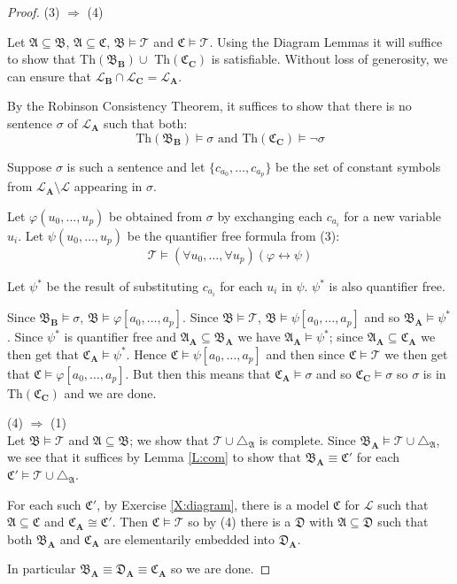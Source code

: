 \documentclass[titlepage, oneside]{amsbook}
\theoremstyle{plain}
\theoremstyle{definition}
\theoremstyle{remark}
\newcommand{\Th}{\ensuremath{\mbox{Th}}}
\newcommand{\tria}[1]{\ensuremath{\triangle_{\mathfrak{#1}}}}
\newcommand{\theory}{\ensuremath{\mathcal{T}}}
\newcommand{\lan}{\ensuremath{\mathcal{L}}}
\newcommand{\seq}{\ensuremath{\subseteq}}
\newcommand{\ma}{\ensuremath{\mathfrak{A}}}
\newcommand{\mb}{\ensuremath{\mathfrak{B}}}
\newcommand{\mc}{\ensuremath{\mathfrak{C}}}
\newcommand{\md}{\ensuremath{\mathfrak{D}}}
\newcommand{\ba}{\ensuremath{\mathbf{A}}}
\newcommand{\bb}{\ensuremath{\mathbf{B}}}
\newcommand{\bc}{\ensuremath{\mathbf{C}}}
\newcommand{\anot}[2][0]{\ensuremath{ a_{#1} , \dots , a_{#2}}}
\begin{document}
\begin{proof}
(3) $\Rightarrow$ (4)


Let $\mathfrak{A} \subseteq \mathfrak B$, $\mathfrak A \subseteq
\mathfrak C$, $\mathfrak B \models \mathcal T $ and $ \mathfrak C
\models \mathcal T$. Using the Diagram Lemmas it will suffice  
to show that Th$(\mathfrak{B}_{\bb}) \cup
$ Th$(\mathfrak{C}_{\bc} )$ is satisfiable. Without loss of generosity,
we can ensure that $\lan_\bb \cap \lan_\bc = \lan_\ba$.


By the Robinson Consistency Theorem, it suffices to show that there is
no sentence $\sigma$ of $\mathcal{L}_{\ba}$  such that both: \[
\mbox{Th}(\mathfrak{B}_{\bb} ) \models
\sigma \mbox{ and } \mbox{Th} (\mathfrak{C}_{\bc}) \models \neg \sigma
\]


Suppose $\sigma$ is such a sentence and let $\{ c_{a_0}  , \dots , c_{a_p} \}$ be the set of constant symbols
from $\mathcal{L}_\ba \setminus \mathcal L$ appearing in $\sigma$.

Let $\varphi  (u_0, \dots , u_p )$ be obtained from $\sigma$ by  
exchanging each 
$c_{a_i}$ for a new variable $u_i$.    Let $\psi (u_0, \dots, u_p)$ be
the quantifier free formula from (3): \[ \mathcal T \models (\forall
u_0,\dots ,\forall u_p) ( \varphi \leftrightarrow \psi ) \]

Let $\psi^{\ast}$ be the result of substituting $c_{a_i}$ for each
$u_i$ in $\psi$.  $\psi^{\ast}$ is also quantifier free.

Since $\mb_\bb \models \sigma$, $\mb \models \varphi [ \anot p ]$.
Since
$\mb \models \theory$, $\mb \models \psi [ \anot p ]$ and so
$\mb_\ba \models \psi^{\ast}$.  Since $\psi^{\ast}$ is quantifier
free and $\ma_\ba \seq \mb_\ba$ we have $\ma_\ba \models
\psi^{\ast}$; since $\ma_\ba \seq \mc_\ba $ we then get that
$\mc_\ba \models \psi^{\ast}$.  Hence $\mc \models \psi [ \anot p
] $ and then since $\mc \models \theory$ we then get that $\mc \models
\varphi [ \anot p ]$.  But then this means that $\mc_\ba \models
\sigma$
and so $\mc_\bc \models \sigma$ so $\sigma$ is in $\Th ( \mc_\bc )$ and
we are done.

(4) $\Rightarrow$ (1) \\
Let $\mb \models \theory$ and $\ma \seq \mb$; we show that $\theory
\cup \tria A$ is complete. Since $\mb_\ba \models \theory \cup
\tria A$, we see that it suffices by Lemma \ref{L:com} to show that
$\mb_\ba \equiv \mc'$ for each $\mc' \models \theory \cup \tria A$.

For each such $\mc'$, by Exercise \ref{X:diagram}, there is a model $\mc$ for
$\lan$ such that $\ma \seq \mc$ and $\mc_\ba \cong \mc'$.  Then $\mc
\models \theory$ so by (4) there is a $\md$ with $\ma \subseteq \md$ such that both $\mb_\ba $ and $\mc_\ba$ are elementarily embedded into $\md_\ba$.

In particular $\mb_\ba \equiv \md_\ba \equiv \mc_\ba$ so we are done.

\end{proof}
\end{document}
